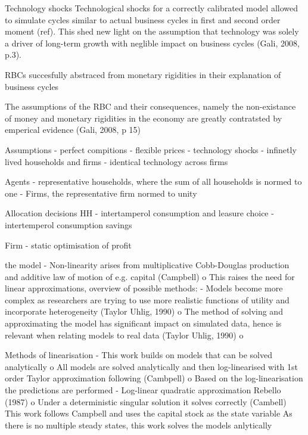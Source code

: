 \documentclass[11pt,a4paper,english]{article} %
\begin{document}
	Technology shocks
	Technological shocks for a correctly calibrated model allowed to simulate cycles similar to actual business cycles in first and second order moment (ref). This shed new light on the assumption that technology was solely a driver of long-term growth with neglible impact on business cycles (Gali, 2008, p.3).
	
	RBCs succesfully abstraced from monetary rigidities in their explanation of business cycles
	
	The assumptions of the RBC and their consequences, namely the non-existance of money and monetary rigidities in the economy are greatly contratsted by emperical evidence (Gali, 2008, p 15)
	
		
	
	Assumptions
	- perfect compitions
	- flexible prices
	- technology shocks
	- infinetly lived households and firms
	- identical technology across firms
	
	Agents
	- representative households, where the sum of all households is normed to one
	- Firms, the representative firm normed to unity
	
	Allocation decisions
	HH
	- intertamperol consumption and leasure choice
	- intertemperol consumption savings 
	
	Firm
	- static optimisation of profit
	
	
	the model
	-	Non-linearity arises from multiplicative Cobb-Douglas production and additive law of motion of e.g. capital (Campbell)
	o	This raises the need for linear approximations, overview of possible methods:
	-	Models become more complex as researchers are trying to use more realistic functions of utility and incorporate heterogeneity (Taylor  Uhlig, 1990)
	o	The method of solving and approximating the model has significant impact on simulated data, hence is relevant when relating models to real data (Taylor  Uhlig, 1990)
	o	
	
	Methods of linearisation
	-	This work builds on models that can be solved analytically
	o	All models are solved analytically and then log-linearised with 1st order Taylor approximation following (Cambpell)
	o	Based on the log-linearisation the predictions are performed
	-	Log-linear quadratic approximation Rebello (1987)
	o	Under a deterministic singular solution it solves correctly (Cambell)
	This work follows Campbell and uses the capital stock as the state variable
	As there is no multiple steady states, this work solves the models anlytically
	
	
	
\end{document}
